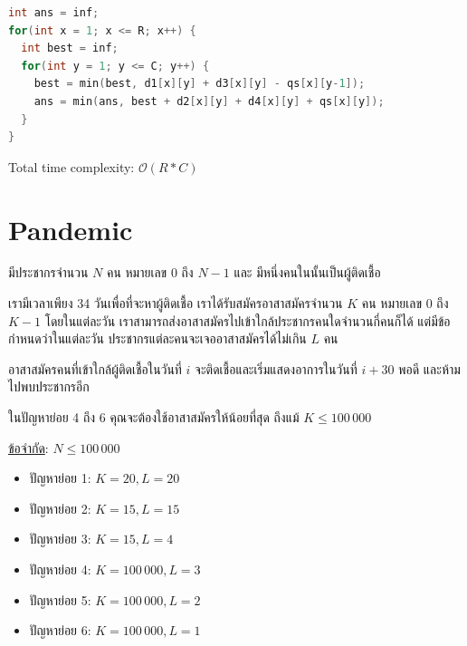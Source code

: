 \documentclass[12pt]{article}
\begin{document}
\begin{lstlisting}[language=C++]
int ans = inf;
for(int x = 1; x <= R; x++) {
  int best = inf;
  for(int y = 1; y <= C; y++) {
    best = min(best, d1[x][y] + d3[x][y] - qs[x][y-1]);   
    ans = min(ans, best + d2[x][y] + d4[x][y] + qs[x][y]);
  }
}
\end{lstlisting}

Total time complexity: $\mathcal{O}(R*C)$

\newpage






































\section{Pandemic}

มีประชากรจำนวน $N$ คน หมายเลข $0$ ถึง $N-1$ และ มีหนึ่งคนในนั้นเป็นผู้ติดเชื้อ 

เรามีเวลาเพียง 34 วันเพื่อที่จะหาผู้ติดเชื้อ เราได้รับสมัครอาสาสมัครจำนวน $K$ คน หมายเลข $0$ ถึง $K-1$ โดยในแต่ละวัน เราสามารถส่งอาสาสมัครไปเข้าใกล้ประชากรคนใดจำนวนกี่คนก็ได้  แต่มีข้อกำหนดว่าในแต่ละวัน ประชากรแต่ละคนจะเจออาสาสมัครได้ไม่เกิน $L$ คน

อาสาสมัครคนที่เข้าใกล้ผู้ติดเชื้อในวันที่ $i$ จะติดเชื้อและเริ่มแสดงอาการในวันที่ $i+30$ พอดี
 และห้ามไปพบประชากรอีก

ในปัญหาย่อย 4 ถึง 6 คุณจะต้องใช้อาสาสมัครให้น้อยที่สุด ถึงแม้ $K \leq 100\,000$

\underline{ข้อจำกัด}: $N \leq 100\,000$
\begin{multicols}{2}
\begin{itemize}[leftmargin=*,itemsep=1pt,parsep=1pt]
  \item ปัญหาย่อย 1: $K = 20, L = 20$
  \item ปัญหาย่อย 2: $K = 15, L = 15$
  \item ปัญหาย่อย 3: $K = 15, L = 4$
  \item ปัญหาย่อย 4: $K = 100\,000, L = 3$
  \item ปัญหาย่อย 5: $K = 100\,000, L = 2$
  \item ปัญหาย่อย 6: $K = 100\,000, L = 1$
\end{itemize}
\end{multicols}
\end{document}
